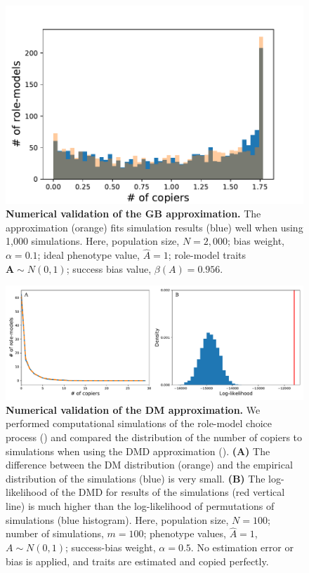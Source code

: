 \documentclass[12pt]{extarticle}
\let\vec\mathbf
\begin{document}
\begin{figure}[h]
    \includegraphics[width=0.7\linewidth]{GBD_validation.pdf}
  \caption{
  \textbf{Numerical validation of the GB approximation.}
  The approximation (orange) fits simulation results (blue) well when using 1,000 simulations. 
  Here, population size, $N=2,000$; bias weight, $\alpha=0.1$; {ideal} phenotype value, $\hat{A}=1$; role-model traits $\vec{A} \sim N(0,1)$; success bias value, $\beta(A)=0.956$.}	
  \label{fig:GBD}
\end{figure}


\begin{figure}[h]
    \includegraphics[width=\linewidth]{DM_validation.pdf}
  \caption{
  \textbf{Numerical validation of the DM approximation.}
  We performed computational simulations of the role-model choice process () and compared the distribution of the number of copiers to simulations when using the DMD approximation ().
  \textbf{(A)} The difference between the DM distribution (orange) and the empirical distribution of the simulations (blue) is very small. 
  \textbf{(B)} The log-likelihood of the DMD for results of the simulations (red vertical line) is much higher {than} the log-likelihood of permutations of simulations (blue histogram).
  Here, population size, $N=100$; number of simulations, $m=100$; phenotype values, $\hat{A}=1$, $A \sim N(0,1)$; success-bias weight, $\alpha=0.5$.
  No estimation error or bias is applied, and traits are estimated and copied perfectly.}	
  \label{fig:DM_validation}
\end{figure}
\end{document}

